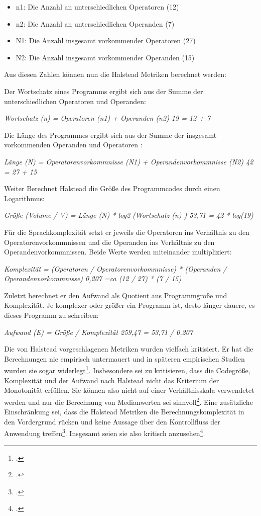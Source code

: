 \begin{itemize}
\item
  n1: Die Anzahl an unterschiedlichen Operatoren (12)
\item
  n2: Die Anzahl an unterschiedlichen Operanden (7)
\item
  N1: Die Anzahl insgesamt vorkommender Operatoren (27)
\item
  N2: Die Anzahl insgesamt vorkommender Operanden (15)
\end{itemize}

Aus diesen Zahlen können nun die Halstead Metriken berechnet werden:

Der Wortschatz eines Programms ergibt sich aus der Summe der
unterschiedlichen Operatoren und Operanden:

\emph{Wortschatz (n) = Operatoren (n1) + Operanden (n2) 19 = 12 + 7}

Die Länge des Programmes ergibt sich aus der Summe der insgesamt
vorkommenden Operanden und Operatoren :

\emph{Länge (N) = Operatorenvorkommnisse (N1) + Operandenvorkommnisse
(N2) 42 = 27 + 15}

Weiter Berechnet Halstead die Größe des Programmcodes durch einen
Logarithmus:

\emph{Größe (Volume / V) = Länge (N) * log2 (Wortschatz (n) ) 53,71 = 42
* log(19)}

Für die Sprachkomplexität setzt er jeweils die Operatoren ins Verhältnis
zu den Operatorenvorkommnissen und die Operanden ins Verhältnis zu den
Operandenvorkommnissen. Beide Werte werden miteinander multipliziert:

\emph{Komplexität = (Operatoren / Operatorenvorkommnisse) * (Operanden /
Operandenvorkommnisse) 0,207 =ca (12 / 27) * (7 / 15)}

Zuletzt berechnet er den Aufwand als Quotient aus Programmgröße und
Komplexität. Je komplexer oder größer ein Programm ist, desto länger
dauere, es dieses Programm zu schreiben:

\emph{Aufwand (E) = Größe / Komplexität 259,47 = 53,71 / 0,207}

Die von Halstead vorgeschlagenen Metriken wurden vielfach kritisiert. Er
hat die Berechnungen nie empirisch untermauert und in späteren
empirischen Studien wurden sie sogar widerlegt\footcite[Vgl. ][]{(Sneed et al
  2010:185)}. Insbesondere sei zu kritisieren, dass die Codegröße,
Komplexität und der Aufwand nach Halstead nicht das Kriterium der
Monotonität erfüllen. Sie können also nicht auf einer Verhältnisskala
verwendetet werden und nur die Berechnung von Medianwerten sei
sinnvoll\footcite[Vgl. ][]{Zuse, H. 1991, S. 142}. Eine zusätzliche Einschränkung
sei, dass die Halstead Metriken die Berechnungskomplexität in den
Vordergrund rücken und keine Aussage über den Kontrollfluss der
Anwendung treffen\footcite[Vgl. ][]{(Rumreich and Kecskemety 2019:2, Quelle 16
  dort}. Insgesamt seien sie also kritisch anzusehen\footcite[Vgl. ][]{(Sneed et
  al 2010:185)}.



